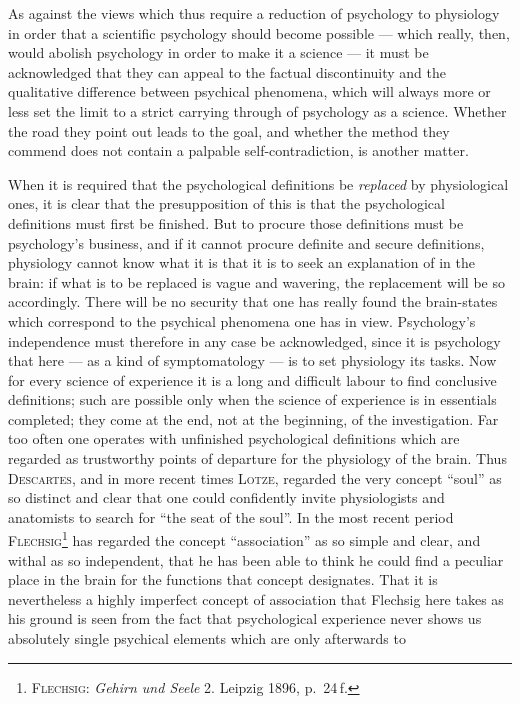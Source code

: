 \documentclass[12pt,a4paper]{book}
\newcommand{\opage}[1]{\marginnote{\footnotesize\textit{[#1]}}}
\begin{document}
As against the views which thus require a reduction of psychology to physiology
in order that a scientific psychology should become possible --- which really,
then, would abolish psychology in order to make it a science --- it must be
acknowledged that they can appeal to the factual discontinuity and the
qualitative difference between psychical phenomena, which will always more \opage{16}or
less set the limit to a strict carrying through of psychology as a science.
Whether the road they point out leads to the goal, and whether the method they
commend does not contain a palpable self-contradiction, is another matter.

When it is required that the psychological definitions be \emph{replaced} by
physiological ones, it is clear that the presupposition of this is that the
psychological definitions must first be finished. But to procure those
definitions must be psychology's business, and if it cannot procure definite and
secure definitions, physiology cannot know what it is that it is to seek an
explanation of in the brain: if what is to be replaced is vague and wavering,
the replacement will be so accordingly. There will be no security that one has
really found the brain-states which correspond to the psychical phenomena one
has in view. Psychology's independence must therefore in any case be
acknowledged, since it is psychology that here --- as a kind of symptomatology
--- is to set physiology its tasks. Now for every science of experience it is a
long and difficult labour to find conclusive definitions; such are possible only
when the science of experience is in essentials completed; they come at the end,
not at the beginning, of the investigation. Far too often one operates with
unfinished psychological definitions which are regarded as trustworthy points of
departure for the physiology of the brain. Thus \textsc{Descartes}, and in more
recent times \textsc{Lotze}, regarded the very concept ``soul'' as so distinct
and clear that one could confidently invite physiologists and anatomists to
search for ``the seat of the soul''. In the most recent period
\textsc{Flechsig}\footnote{\textsc{Flechsig}: \textit{Gehirn und Seele} 2.
Leipzig 1896, p.~24\,f.} has regarded the concept ``association'' as so simple
and clear, and withal as so independent, that he has been able to think he could
find a peculiar place in the brain for the functions that concept designates.
That it is nevertheless a highly imperfect concept of association that Flechsig
here takes as his ground is seen from the fact that psychological experience
never shows us absolutely single psychical elements which are only afterwards to
\end{document}
